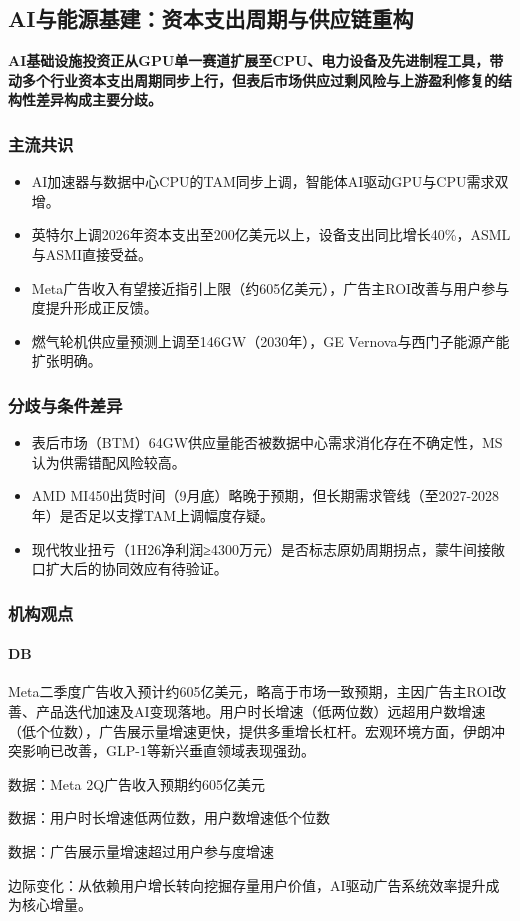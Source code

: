 \documentclass[11pt]{ctexart}
\begin{document}
\subsection{AI与能源基建：资本支出周期与供应链重构}
\textbf{AI基础设施投资正从GPU单一赛道扩展至CPU、电力设备及先进制程工具，带动多个行业资本支出周期同步上行，但表后市场供应过剩风险与上游盈利修复的结构性差异构成主要分歧。}
\subsubsection*{主流共识}
\begin{itemize}
  \item AI加速器与数据中心CPU的TAM同步上调，智能体AI驱动GPU与CPU需求双增。
  \item 英特尔上调2026年资本支出至200亿美元以上，设备支出同比增长40\%，ASML与ASMI直接受益。
  \item Meta广告收入有望接近指引上限（约605亿美元），广告主ROI改善与用户参与度提升形成正反馈。
  \item 燃气轮机供应量预测上调至146GW（2030年），GE Vernova与西门子能源产能扩张明确。
\end{itemize}
\subsubsection*{分歧与条件差异}
\begin{itemize}
  \item 表后市场（BTM）64GW供应量能否被数据中心需求消化存在不确定性，MS认为供需错配风险较高。
  \item AMD MI450出货时间（9月底）略晚于预期，但长期需求管线（至2027-2028年）是否足以支撑TAM上调幅度存疑。
  \item 现代牧业扭亏（1H26净利润≥4300万元）是否标志原奶周期拐点，蒙牛间接敞口扩大后的协同效应有待验证。
\end{itemize}
\subsubsection*{机构观点}
\paragraph{DB} Meta二季度广告收入预计约605亿美元，略高于市场一致预期，主因广告主ROI改善、产品迭代加速及AI变现落地。用户时长增速（低两位数）远超用户数增速（低个位数），广告展示量增速更快，提供多重增长杠杆。宏观环境方面，伊朗冲突影响已改善，GLP-1等新兴垂直领域表现强劲。
{\small\color{refgray}数据：Meta 2Q广告收入预期约605亿美元\par}
{\small\color{refgray}数据：用户时长增速低两位数，用户数增速低个位数\par}
{\small\color{refgray}数据：广告展示量增速超过用户参与度增速\par}
{\small\color{refgray}边际变化：从依赖用户增长转向挖掘存量用户价值，AI驱动广告系统效率提升成为核心增量。\par}
\end{document}

